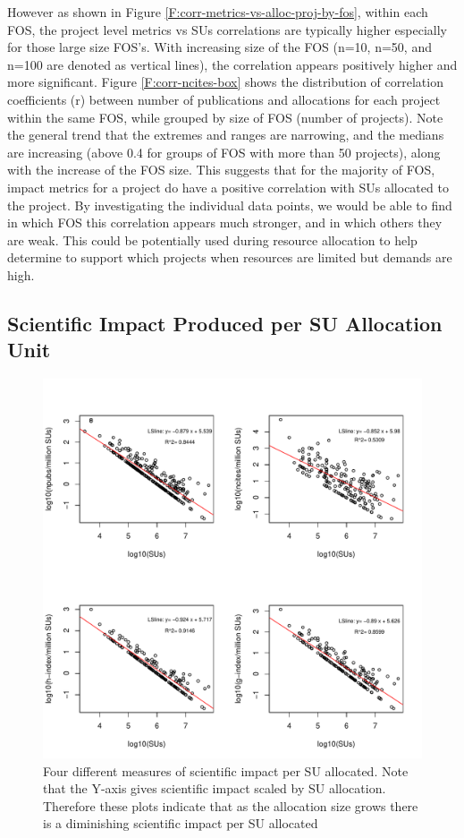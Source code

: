 \documentclass{sig-alternate}
\begin{document}
However as shown in Figure \ref{F:corr-metrics-vs-alloc-proj-by-fos}, within each FOS, the project level metrics vs SUs correlations are typically higher especially for those large size FOS's. With increasing size of the FOS (n=10, n=50, and n=100 are denoted as vertical lines), the correlation appears positively higher and more significant. Figure \ref{F:corr-ncites-box} shows the distribution of correlation coefficients (r) between number of publications and allocations for each project within the same FOS, while grouped by size of FOS (number of projects). Note the general trend that the extremes and ranges are narrowing, and the medians are increasing (above 0.4 for groups of FOS with more than 50 projects), along with the increase of the FOS size. This suggests that for the majority of FOS, impact metrics for a project do have a positive correlation with SUs allocated to the project. By investigating the individual data points, we would be able to find in which FOS this correlation appears much stronger, and in which others they are weak. This could be potentially used during resource allocation to help determine to support which projects when resources are limited but demands are high.

\subsection{Scientific Impact Produced per SU Allocation Unit} 

\begin{figure}[!htb] 
  \centering 
    \includegraphics[width=1.0\columnwidth]{images/09_roi_projs.pdf} 
  \caption{Four different measures of scientific impact per SU allocated.  Note that the Y-axis gives scientific impact scaled by SU allocation. Therefore these plots indicate that as the allocation size grows there is a diminishing scientific impact per SU allocated}\label{F:projs-roi} 
\end{figure} 
\end{document}
